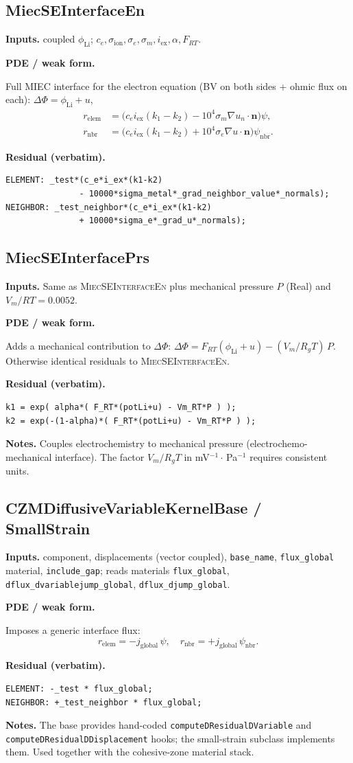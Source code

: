 \documentclass[11pt]{article}
\newcommand{\Rg}{R_{\!g}}           %
\newcommand{\nvec}{\mathbf{n}}
\newenvironment{ecmEntry}[1]{%
  \subsection{#1}%
}{}
\newcommand{\inputsRow}[1]{\par\noindent\textbf{Inputs.} #1\par}
\newcommand{\pdeRow}[1]{\par\noindent\textbf{PDE / weak form.}\par #1\par}
\newcommand{\codeRow}{\par\noindent\textbf{Residual (verbatim).}\par}
\newcommand{\notesRow}[1]{\par\noindent\textbf{Notes.} #1\par}
\begin{document}
\begin{ecmEntry}{MiecSEInterfaceEn}
\inputsRow{coupled $\phi_{\text{Li}}$; $c_e,\sigma_{\text{ion}},\sigma_e,\sigma_m,
i_{\text{ex}},\alpha,F_{RT}$.}
\pdeRow{Full MIEC interface for the electron equation (BV on both sides + ohmic flux on each):
$\Delta\Phi = \phi_{\text{Li}} + u$,
\[
\begin{aligned}
 r_{\text{elem}} &= \bigl(c_e i_{\text{ex}}(k_1-k_2) - 10^4\sigma_m \nabla u_n\!\cdot\!\nvec\bigr)\psi,\\
 r_{\text{nbr}}  &= \bigl(c_e i_{\text{ex}}(k_1-k_2) + 10^4\sigma_e \nabla u\!\cdot\!\nvec\bigr)\psi_{\text{nbr}}.
\end{aligned}
\]}
\codeRow\begin{lstlisting}
ELEMENT: _test*(c_e*i_ex*(k1-k2)
               - 10000*sigma_metal*_grad_neighbor_value*_normals);
NEIGHBOR: _test_neighbor*(c_e*i_ex*(k1-k2)
               + 10000*sigma_e*_grad_u*_normals);
\end{lstlisting}
\end{ecmEntry}

\begin{ecmEntry}{MiecSEInterfacePrs}
\inputsRow{Same as \textsc{MiecSEInterfaceEn} plus mechanical pressure $P$ (Real) and
$V_m/RT = 0.0052$.}
\pdeRow{Adds a mechanical contribution to $\Delta\Phi$:
$\Delta\Phi = F_{RT}(\phi_{\text{Li}}+u) - (V_m/\Rg T)\,P$.
Otherwise identical residuals to \textsc{MiecSEInterfaceEn}.}
\codeRow\begin{lstlisting}
k1 = exp( alpha*( F_RT*(potLi+u) - Vm_RT*P ) );
k2 = exp(-(1-alpha)*( F_RT*(potLi+u) - Vm_RT*P ) );
\end{lstlisting}
\notesRow{Couples electrochemistry to mechanical pressure (electrochemo-mechanical
interface). The factor $V_m/\Rg T$ in mV$^{-1}\!\cdot$\,Pa$^{-1}$ requires consistent units.}
\end{ecmEntry}

\begin{ecmEntry}{CZMDiffusiveVariableKernelBase / SmallStrain}
\inputsRow{component, displacements (vector coupled), \texttt{base\_name}, \texttt{flux\_global}
material, \texttt{include\_gap}; reads materials \texttt{flux\_global},
\texttt{dflux\_dvariablejump\_global}, \texttt{dflux\_djump\_global}.}
\pdeRow{Imposes a generic interface flux:
\[
  r_{\text{elem}} = -j_{\text{global}}\,\psi,\quad r_{\text{nbr}}=+j_{\text{global}}\,\psi_{\text{nbr}}.
\]}
\codeRow\begin{lstlisting}
ELEMENT: -_test * flux_global;
NEIGHBOR: +_test_neighbor * flux_global;
\end{lstlisting}
\notesRow{The base provides hand-coded \texttt{computeDResidualDVariable} and
\texttt{computeDResidualDDisplacement} hooks; the small-strain subclass implements them.
Used together with the cohesive-zone material stack.}
\end{ecmEntry}
\end{document}
